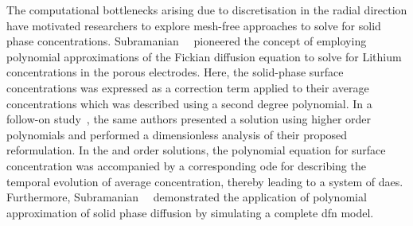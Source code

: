 The  computational  bottlenecks arising  due  to  discretisation in  the  radial
direction  have  motivated  researchers   to  explore  mesh-free  approaches  to
solve for  solid phase  concentrations. Subramanian~\etal~\cite{Subramanian2004}
pioneered  the concept  of employing  polynomial approximations  of the  Fickian
diffusion equation to solve for Lithium concentrations in the porous electrodes.
Here,  the solid-phase  surface  concentrations was  expressed  as a  correction
term  applied  to their  average  concentrations  which  was described  using  a
second degree polynomial. In  a follow-on study~\cite{Subramanian2005}, the same
authors  presented a  solution using  higher order  polynomials and  performed a
dimensionless analysis of their  proposed reformulation. In the 
and    order  solutions,  the polynomial  equation  for  surface
concentration was  accompanied by a  corresponding \gls{ode} for  describing the
temporal  evolution of  average concentration,  thereby leading  to a  system of
\gls{dae}s. Furthermore, Subramanian~\etal{}~\cite{Subramanian2007} demonstrated
the  application  of  polynomial  approximation  of  solid  phase  diffusion  by
simulating  a complete  \gls{dfn}  model.


